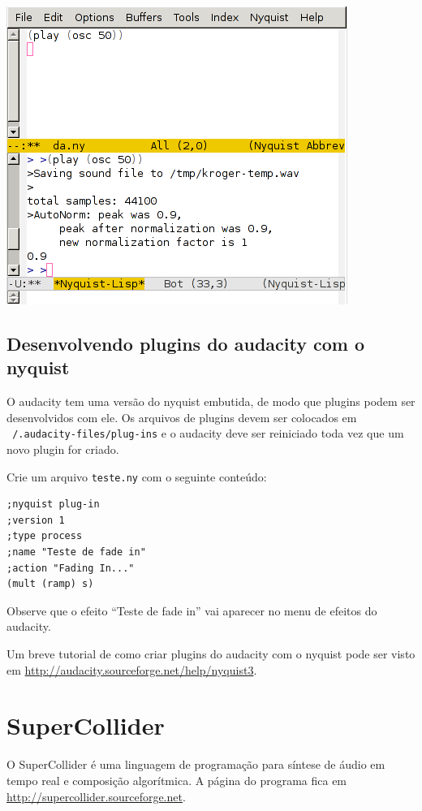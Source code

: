 \documentclass[12pt,brazil]{book}
\begin{document}
\begin{latexonly}
  \includegraphics[scale=.5]{ny2}
\end{latexonly}

\section{Desenvolvendo plugins do audacity com o nyquist}
\label{sec:desenv-plug-do}

O audacity tem uma versão do nyquist embutida, de modo que plugins
podem ser desenvolvidos com ele. Os arquivos de plugins devem ser
colocados em \texttt{~/.audacity-files/plug-ins} e o audacity deve ser
reiniciado toda vez que um novo plugin for criado. 

Crie um arquivo \texttt{teste.ny} com o seguinte conteúdo:

\begin{verbatim}
;nyquist plug-in
;version 1
;type process
;name "Teste de fade in"
;action "Fading In..."
(mult (ramp) s)
\end{verbatim}

Observe que o efeito ``Teste de fade in'' vai aparecer no menu de
efeitos do audacity.

Um breve tutorial de como criar plugins do audacity com o nyquist pode
ser visto em \url{http://audacity.sourceforge.net/help/nyquist3}.

\chapter{SuperCollider}
\label{cha:supercollider}

O SuperCollider é uma linguagem de programação para síntese de áudio
em tempo real e composição algorítmica. A página do programa fica em
\url{http://supercollider.sourceforge.net}.
\end{document}
